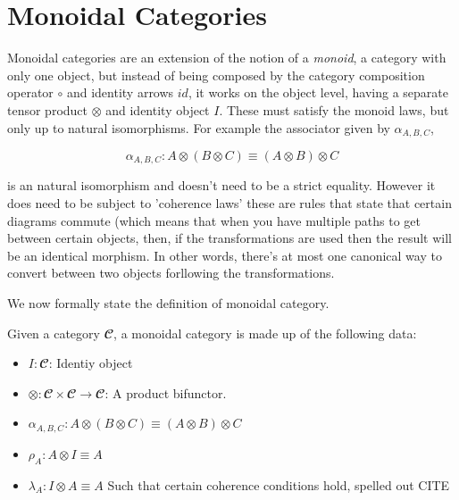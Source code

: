 \section{Monoidal Categories}

Monoidal categories are an extension of the notion of a \emph{monoid}, a
category with only one object, but instead of being composed by the category
composition operator $\circ$ and identity arrows $id$, it works on the object
level, having a separate tensor product $\otimes$ and identity object $I$.
These must satisfy the monoid laws, but only up to natural
isomorphisms. For example the associator given by $\alpha_{A,B,C}$,

$$\alpha_{A,B,C} : A \otimes (B \otimes C) \equiv (A \otimes B) \otimes C$$

is an natural isomorphism and doesn't need to be a strict
equality. However it does need to be subject to 'coherence laws' these
are rules that state that certain diagrams commute (which means that
when you have multiple paths to get between certain objects, then, if
the transformations are used then the result will be an identical
morphism. In other words, there's at most one canonical way to convert
between two objects forllowing the transformations.

We now formally state the definition of monoidal category.

\begin{definition}
  Given a category $𝓒$, a monoidal category is made up of the following
  data:

\begin{itemize}
  \item $I : 𝓒$: Identiy object
  \item $\otimes : 𝓒 × 𝓒 → 𝓒$: A product bifunctor.
  \item $\alpha_{A,B,C} : A \otimes (B \otimes C) \equiv (A \otimes B) \otimes C$
  \item $\rho_A : A \otimes I \equiv A$
  \item $λ_A : I \otimes A \equiv A$
  Such that certain coherence conditions hold, spelled out CITE
\end{itemize}

\end{definition}
